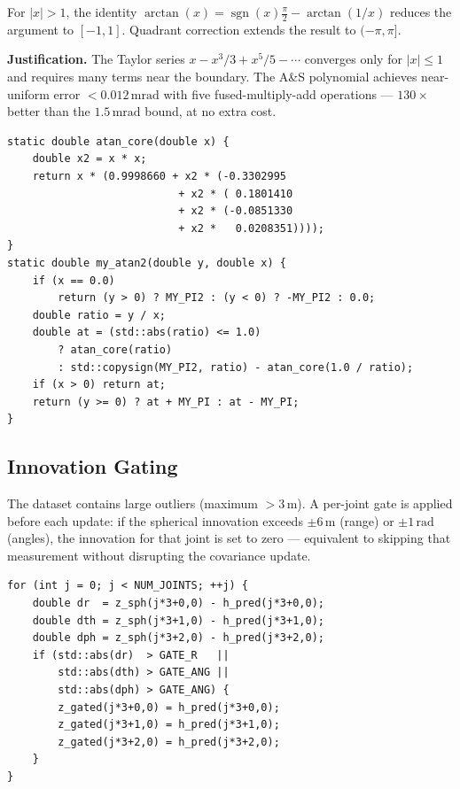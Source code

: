 \documentclass[11pt, a4paper]{article}
\begin{document}
For $|x|>1$, the identity $\arctan(x) = \operatorname{sgn}(x)\tfrac{\pi}{2}
- \arctan(1/x)$ reduces the argument to $[-1,1]$.
Quadrant correction extends the result to $(-\pi,\pi]$.

\textbf{Justification.} The Taylor series $x - x^3/3 + x^5/5 - \cdots$
converges only for $|x|\le1$ and requires many terms near the boundary.
The A\&S polynomial achieves near-uniform error $< 0.012\,\text{mrad}$
with five fused-multiply-add operations --- $130\times$ better than the
$1.5\,\text{mrad}$ bound, at no extra cost.

\begin{lstlisting}[caption={Manual \texttt{atan2} in \texttt{ekf.cpp} --- A\&S minimax polynomial}]
static double atan_core(double x) {
    double x2 = x * x;
    return x * (0.9998660 + x2 * (-0.3302995
                           + x2 * ( 0.1801410
                           + x2 * (-0.0851330
                           + x2 *   0.0208351))));
}
static double my_atan2(double y, double x) {
    if (x == 0.0)
        return (y > 0) ? MY_PI2 : (y < 0) ? -MY_PI2 : 0.0;
    double ratio = y / x;
    double at = (std::abs(ratio) <= 1.0)
        ? atan_core(ratio)
        : std::copysign(MY_PI2, ratio) - atan_core(1.0 / ratio);
    if (x > 0) return at;
    return (y >= 0) ? at + MY_PI : at - MY_PI;
}
\end{lstlisting}

\subsection{Innovation Gating}
\label{sec:gating}

The dataset contains large outliers (maximum $>3\,\text{m}$).
A per-joint gate is applied before each update: if the spherical innovation
exceeds $\pm6\,\text{m}$ (range) or $\pm1\,\text{rad}$ (angles), the innovation
for that joint is set to zero --- equivalent to skipping that measurement without
disrupting the covariance update.

\begin{lstlisting}[caption={Per-joint innovation gating in \texttt{ekf.cpp}}]
for (int j = 0; j < NUM_JOINTS; ++j) {
    double dr  = z_sph(j*3+0,0) - h_pred(j*3+0,0);
    double dth = z_sph(j*3+1,0) - h_pred(j*3+1,0);
    double dph = z_sph(j*3+2,0) - h_pred(j*3+2,0);
    if (std::abs(dr)  > GATE_R   ||
        std::abs(dth) > GATE_ANG ||
        std::abs(dph) > GATE_ANG) {
        z_gated(j*3+0,0) = h_pred(j*3+0,0);
        z_gated(j*3+1,0) = h_pred(j*3+1,0);
        z_gated(j*3+2,0) = h_pred(j*3+2,0);
    }
}
\end{lstlisting}
\end{document}
